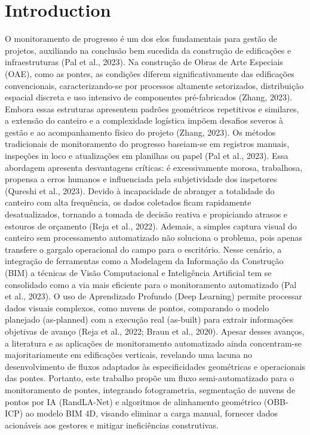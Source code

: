 \documentclass[conference]{IEEEtran}
\begin{document}
\section{Introduction}
O monitoramento de progresso é um dos elos fundamentais para gestão de projetos, auxiliando na conclusão bem sucedida da construção de edificações e infraestruturas (Pal et al., 2023). Na construção de Obras de Arte Especiais (OAE), como as pontes, as condições diferem significativamente das edificações convencionais, caracterizando-se por processos altamente setorizados, distribuição espacial discreta e uso intensivo de componentes pré-fabricados (Zhang, 2023). Embora essas estruturas apresentem padrões geométricos repetitivos e similares, a extensão do canteiro e a complexidade logística impõem desafios severos à gestão e ao acompanhamento físico do projeto (Zhang, 2023).   Os métodos tradicionais de monitoramento do progresso baseiam-se em registros manuais, inspeções in loco e atualizações em planilhas ou papel (Pal et al., 2023). Essa abordagem apresenta desvantagens críticas: é excessivamente morosa, trabalhosa, propensa a erros humanos e influenciada pela subjetividade dos inspetores (Qureshi et al., 2023). Devido à incapacidade de abranger a totalidade do canteiro com alta frequência, os dados coletados ficam rapidamente desatualizados, tornando a tomada de decisão reativa e propiciando atrasos e estouros de orçamento (Reja et al., 2022). Ademais, a simples captura visual do canteiro sem processamento automatizado não soluciona o problema, pois apenas transfere o gargalo operacional do campo para o escritório.   Nesse cenário, a integração de ferramentas como a Modelagem da Informação da Construção (BIM) a técnicas de Visão Computacional e Inteligência Artificial tem se consolidado como a via mais eficiente para o monitoramento automatizado (Pal et al., 2023). O uso de Aprendizado Profundo (Deep Learning) permite processar dados visuais complexos, como nuvens de pontos, comparando o modelo planejado (as-planned) com a execução real (as-built) para extrair informações objetivas de avanço (Reja et al., 2022; Braun et al., 2020).   Apesar desses avanços, a literatura e as aplicações de monitoramento automatizado ainda concentram-se majoritariamente em edificações verticais, revelando uma lacuna no desenvolvimento de fluxos adaptados às especificidades geométricas e operacionais das pontes. Portanto, este trabalho propõe um fluxo semi-automatizado para o monitoramento de pontes, integrando fotogrametria, segmentação de nuvens de pontos por IA (RandLA-Net) e algoritmos de alinhamento geométrico (OBB-ICP) ao modelo BIM 4D, visando eliminar a carga manual, fornecer dados acionáveis aos gestores e mitigar ineficiências construtivas.   
\end{document}
